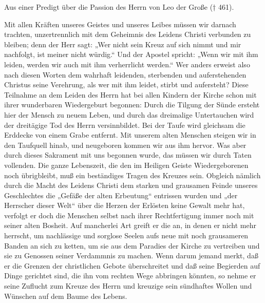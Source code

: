 \vspace{5pt}

Aus einer Predigt über die Passion des Herrn von Leo der Große († 461).

\vspace{5pt}


\lettrine[lines=3]{M}{}it allen Kräften unseres Geistes und unseres Leibes müssen wir darnach trachten, unzertrennlich mit dem Geheimnis des Leidens Christi verbunden zu bleiben; denn der Herr sagt: „Wer nicht sein Kreuz auf sich nimmt und mir nachfolgt, ist meiner nicht würdig.“ Und der Apostel spricht: „Wenn wir mit ihm leiden, werden wir auch mit ihm verherrlicht werden.“ Wer anders erweist also nach diesen Worten dem wahrhaft leidenden, sterbenden und auferstehenden Christus seine Verehrung, als wer mit ihm leidet, stirbt und aufersteht? Diese Teilnahme an dem Leiden des Herrn hat bei allen Kindern der Kirche schon mit ihrer wunderbaren Wiedergeburt begonnen: Durch die Tilgung der Sünde ersteht hier der Mensch zu neuem Leben, und durch das dreimalige Untertauchen wird der dreitägige Tod des Herrn versinnbildet. Bei der Taufe wird gleichsam die Erddecke von einem Grabe entfernt. Mit unserem alten Menschen steigen wir in den Taufquell hinab, und neugeboren kommen wir aus ihm hervor. Was aber durch dieses Sakrament mit uns begonnen wurde, das müssen wir durch Taten vollenden. Die ganze Lebenszeit, die den im Heiligen Geiste Wiedergeborenen noch übrigbleibt, muß ein beständiges Tragen des Kreuzes sein. Obgleich nämlich durch die Macht des Leidens Christi dem starken und grausamen Feinde unseres Geschlechtes die „Gefäße der alten Erbeutung“ entrissen wurden und „der Herrscher dieser Welt“ über die Herzen der Erlösten keine Gewalt mehr hat, verfolgt er doch die Menschen selbst nach ihrer Rechtfertigung immer noch mit seiner alten Bosheit. Auf mancherlei Art greift er die an, in denen er nicht mehr herrscht, um nachlässige und sorglose Seelen aufs neue mit noch grausameren Banden an sich zu ketten, um sie aus dem Paradies der Kirche zu vertreiben und sie zu Genossen seiner Verdammnis zu machen. Wenn darum jemand merkt, daß er die Grenzen der christlichen Gebote überschreitet und daß seine Begierden auf Dinge gerichtet sind, die ihn vom rechten Wege abbringen könnten, so nehme er seine Zuflucht zum Kreuze des Herrn und kreuzige sein sündhaftes Wollen und Wünschen auf dem Baume des Lebens.